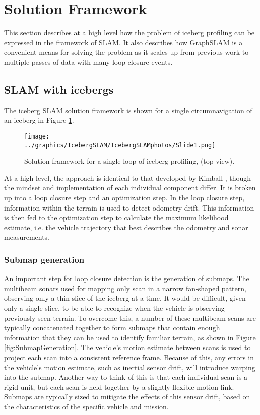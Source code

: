\section{Solution Framework}

This section describes at a high level how the problem of iceberg profiling can be expressed in the framework of SLAM. It also describes how GraphSLAM is a convenient means for solving the problem as it scales up from previous work to multiple passes of data with many loop closure events.

\subsection{SLAM with icebergs}

The iceberg SLAM solution framework is shown for a single circumnavigation of an iceberg in Figure \ref{fig:icebergSLAM}.

\begin{figure}[htb]
   \centering
   \texttt{[image: ../graphics/IcebergSLAM/IcebergSLAMphotos/Slide1.png]} %
   \caption{Solution framework for a single loop of iceberg profiling, (top view). }
   \label{fig:icebergSLAM}
\end{figure}

At a high level, the approach is identical to that developed by Kimball \cite{?}, though the mindset and implementation of each individual component differ. It is broken up into a loop closure step and an optimization step. In the loop closure step, information within the terrain is used to detect odometry drift. This information is then fed to the optimization step to calculate the maximum likelihood estimate, i.e. the vehicle trajectory that best describes the odometry and sonar measurements.

\subsubsection{Submap generation}
\label{sec.SubmapGeneration}
An important step for loop closure detection is the generation of submaps. The multibeam sonars used for mapping only scan in a narrow fan-shaped pattern, observing only a thin slice of the iceberg at a time. It would be difficult, given only a single slice, to be able to recognize when the vehicle is observing previously-seen terrain. To overcome this, a number of these multibeam scans are typically concatenated together to form submaps that contain enough information that they can be used to identify familiar terrain, as shown in Figure \ref{fig:SubmapGeneration}. The vehicle's motion estimate between scans is used to project each scan into a consistent reference frame. Because of this, any errors in the vehicle's motion estimate, such as inertial sensor drift, will introduce warping into the submap. Another way to think of this is that each individual scan is a rigid unit, but each scan is held together by a slightly flexible motion link. Submaps are typically sized to mitigate the effects of this sensor drift, based on the characteristics of the specific vehicle and mission.

